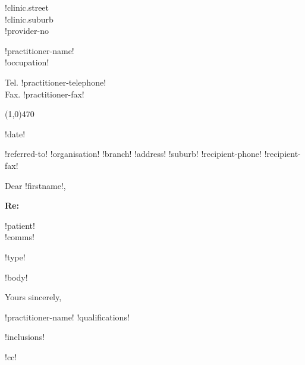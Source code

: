 \documentclass{article}
\begin{document}
\linethickness{0.4mm}

\noindent
\parbox[t]{53mm}{!clinic.street \\ !clinic.suburb \\ !provider-no} \parbox[t]{54mm}{\centering !practitioner-name!\\ \vspace{1.5mm} {\Large !occupation!}}  
\parbox[t]{53mm}{\raggedleft Tel. !practitioner-telephone! \\ Fax. !practitioner-fax!}
\vspace{-0.70cm}

\noindent
\begin{center}
\line(1,0){470}
\end{center}

\begin{flushright} 
!date!
\end{flushright}

\noindent 
{\raggedright
!referred-to! !organisation! !branch! !address!
!suburb! !recipient-phone! !recipient-fax!
 }

\vspace{6mm}

\noindent
Dear !firstname!,

\vspace{1mm}

\noindent
\parbox[t]{10mm}{\textbf{Re:}} \parbox[t]{140mm}{!patient! \\ !comms!}
\vspace{-3mm}

!type!

\noindent !body!

\vspace{6mm}

\begin{samepage}
Yours sincerely,


!practitioner-name! !qualifications!

!inclusions!

!cc!
\end{samepage}
\end{document}
